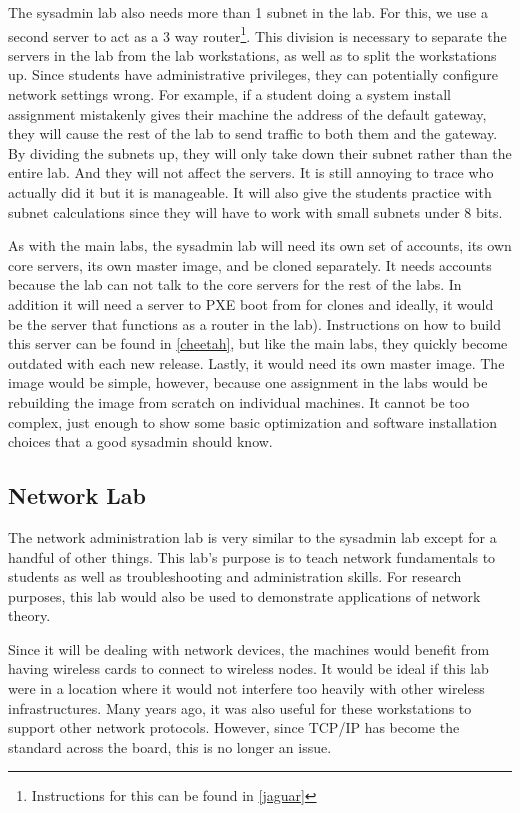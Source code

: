 The sysadmin lab also needs more than 1 subnet in the lab.  For this, we use a second server to act as a 3 way router\footnote{Instructions for this can be found in \ref{jaguar}}.  This division is necessary to separate the servers in the lab from the lab workstations, as well as to split the workstations up.  Since students have administrative privileges, they can potentially configure network settings wrong.  For example, if a student doing a system install assignment mistakenly gives their machine the address of the default gateway, they will cause the rest of the lab to send traffic to both them and the gateway.  By dividing the subnets up, they will only take down their subnet rather than the entire lab.  And they will not affect the servers.  It is still annoying to trace who actually did it but it is manageable.  It will also give the students practice with subnet calculations since they will have to work with small subnets under 8 bits.

As with the main labs, the sysadmin lab will need its own set of accounts, its own core servers, its own master image, and be cloned separately.  It needs accounts because the lab can not talk to the core servers for the rest of the labs.  In addition it will need a server to PXE boot from for clones and ideally, it would be the server that functions as a router in the lab).  Instructions on how to build this server can be found in \ref{cheetah}, but like the main labs, they quickly become outdated with each new release.  Lastly, it would need its own master image.  The image would be simple, however, because one assignment in the labs would be rebuilding the image from scratch on individual machines.  It cannot be too complex, just enough to show some basic optimization and software installation choices that a good sysadmin should know.  
\subsection{Network Lab}
The network administration lab is very similar to the sysadmin lab except for a handful of other things.  This lab's purpose is to teach network fundamentals to students as well as troubleshooting and administration skills.  For research purposes, this lab would also be used to demonstrate applications of network theory.  

Since it will be dealing with network devices, the machines would benefit from having wireless cards to connect to wireless nodes.  It would be ideal if this lab were in a location where it would not interfere too heavily with other wireless infrastructures.  Many years ago, it was also useful for these workstations to support other network protocols.  However, since TCP/IP has become the standard across the board, this is no longer an issue.  

